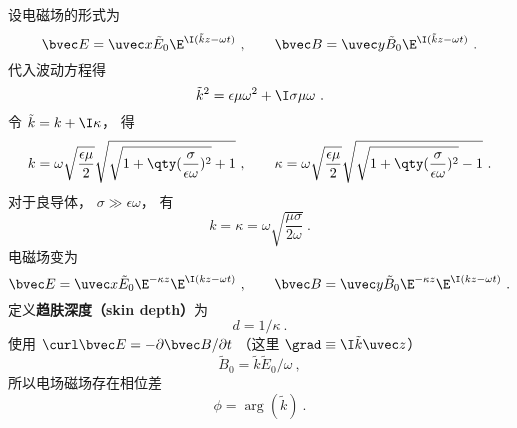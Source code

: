 设电磁场的形式为
\begin{equation}
\bvec E = \uvec x \tilde E_0 \E^{\I (\tilde k z - \omega t)}~,
\qquad
\bvec B = \uvec y \tilde B_0 \E^{\I (\tilde k z - \omega t)}~.
\end{equation}
代入波动方程得
\begin{equation}
\tilde k^2 = \epsilon\mu \omega^2 + \I \sigma \mu \omega~.
\end{equation}
令 $\tilde k = k + \I \kappa$， 得
\begin{equation}
k = \omega\sqrt{\frac{\epsilon\mu}{2}} \sqrt{\sqrt{1 + \qty(\frac{\sigma}{\epsilon\omega})^2} + 1}~,
\qquad
\kappa = \omega\sqrt{\frac{\epsilon\mu}{2}} \sqrt{\sqrt{1 + \qty(\frac{\sigma}{\epsilon\omega})^2} - 1}~.
\end{equation}
对于良导体， $\sigma \gg \epsilon\omega$， 有
\begin{equation}
k = \kappa = \omega \sqrt{\frac{\mu\sigma}{2\omega}}~.
\end{equation}
电磁场变为
\begin{equation}
\bvec E = \uvec x \tilde E_0 \E^{-\kappa z} \E^{\I (kz - \omega t)}~,
\qquad
\bvec B = \uvec y \tilde B_0 \E^{-\kappa z} \E^{\I (kz - \omega t)}~.
\end{equation}
定义\textbf{趋肤深度（skin depth）}为
\begin{equation}
d = 1/\kappa~.
\end{equation}
使用 $\curl \bvec E = -\partial \bvec B / \partial t$ （这里 $\grad \equiv \I \tilde k \uvec z$）
\begin{equation}
\tilde B_0 = \tilde k \tilde E_0 / \omega~,
\end{equation}
所以电场磁场存在相位差
\begin{equation}
\phi = \arg (\tilde k)~.
\end{equation}

